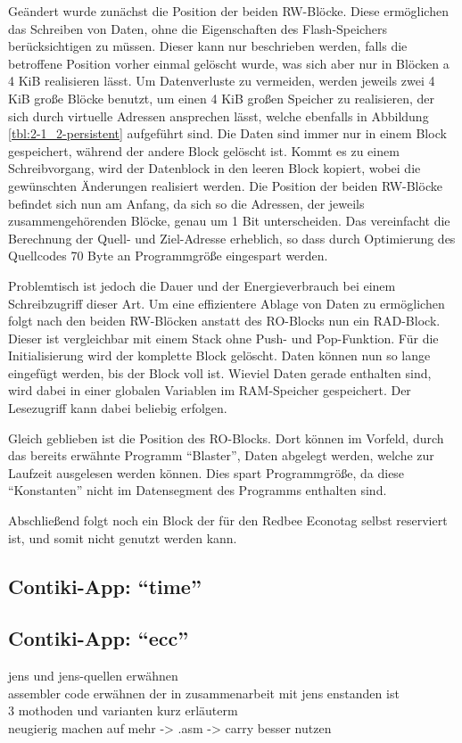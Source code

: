 Geändert wurde zunächst die Position der beiden RW-Blöcke. Diese ermöglichen das Schreiben von Daten, ohne die Eigenschaften des Flash-Speichers berücksichtigen
zu müssen. Dieser kann nur beschrieben werden, falls die betroffene Position vorher einmal gelöscht wurde, was sich aber nur in Blöcken a 4 KiB realisieren lässt.
Um Datenverluste zu vermeiden, werden jeweils zwei 4 KiB große Blöcke benutzt, um einen 4 KiB großen Speicher zu realisieren, der sich durch virtuelle Adressen
ansprechen lässt, welche ebenfalls in Abbildung \ref{tbl:2-1_2-persistent} aufgeführt sind. Die Daten sind immer nur in einem Block gespeichert, während der andere
Block gelöscht ist. Kommt es zu einem Schreibvorgang, wird der Datenblock in den leeren Block kopiert, wobei die gewünschten Änderungen realisiert werden.
Die Position der beiden RW-Blöcke befindet sich nun am Anfang, da sich so die Adressen, der jeweils zusammengehörenden Blöcke, genau um 1 Bit unterscheiden.
Das vereinfacht die Berechnung der Quell- und Ziel-Adresse erheblich, so dass durch Optimierung des Quellcodes 70 Byte an Programmgröße eingespart werden.

Problemtisch ist jedoch die Dauer und der Energieverbrauch bei einem Schreibzugriff dieser Art. Um eine effizientere Ablage von Daten zu ermöglichen folgt
nach den beiden RW-Blöcken anstatt des RO-Blocks nun ein RAD-Block. Dieser ist vergleichbar mit einem Stack ohne Push- und Pop-Funktion. Für die Initialisierung
wird der komplette Block gelöscht. Daten können nun so lange eingefügt werden, bis der Block voll ist. Wieviel Daten gerade enthalten sind, wird dabei in einer
globalen Variablen im RAM-Speicher gespeichert. Der Lesezugriff kann dabei beliebig erfolgen.

Gleich geblieben ist die Position des RO-Blocks. Dort können im Vorfeld, durch das bereits erwähnte Programm "`Blaster"', Daten abgelegt werden, welche zur Laufzeit
ausgelesen werden können. Dies spart Programmgröße, da diese "`Konstanten"' nicht im Datensegment des Programms enthalten sind.

Abschließend folgt noch ein Block der für den Redbee Econotag selbst reserviert ist, und somit nicht genutzt werden kann.

\subsection{Contiki-App: "`time"'}



\subsection{Contiki-App: "`ecc"'}
jens und jens-quellen erwähnen\\
assembler code erwähnen der in zusammenarbeit mit jens enstanden ist\\
3 mothoden und varianten kurz erläuterm\\
neugierig machen auf mehr -> .asm -> carry besser nutzen


